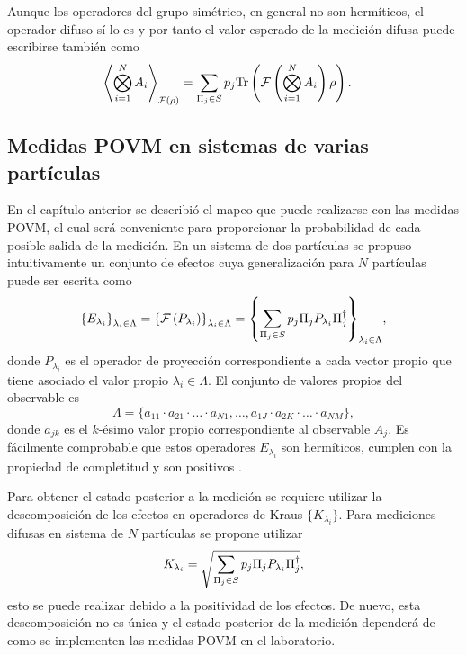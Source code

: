 Aunque los operadores del grupo simétrico, en general no son hermíticos, el operador difuso sí lo es y por tanto el valor esperado de la medición difusa puede escribirse también como \begin{equation}\label{eq:ExpectedValue-generalForm-2}\begin{split}
    \left \langle \bigotimes_{i=1}^{N} A_i\right \rangle_{\mathcal{F}(\rho)} &=\sum_{\Pi_j \in S}p_{j}{\rm Tr} \left(\mathcal{F}\left(\bigotimes_{i=1}^{N} A_i\right)\rho\right).
\end{split}
\end{equation} 



\subsection{Medidas POVM en sistemas de varias partículas}
En el capítulo anterior se describió el mapeo que puede realizarse con las medidas POVM, el cual será conveniente para proporcionar la probabilidad de cada posible salida de la medición. En un sistema de dos partículas se propuso intuitivamente un conjunto de efectos cuya generalización para $N$ partículas puede ser escrita como \begin{equation}\label{eq:effectsSetNp}
    {\{E_{\lambda_i}\}}_{\lambda_i \in \Lambda}={\{\mathcal{F}\left(P_{\lambda_i}\right)\}}_{\lambda_i \in \Lambda}={\left\{\sum_{\Pi_j \in S} p_j \Pi_{j}P_{\lambda_i}\Pi_{j}^{\dagger}\right\}}_{\lambda_i \in \Lambda},
\end{equation}  
donde $P_{\lambda_i}$ es el operador de proyección correspondiente a cada vector propio que tiene asociado el valor propio $\lambda_i\in \Lambda$. El conjunto de valores propios del observable es \begin{equation}\label{eq:lambdaeigenvalues}
    \Lambda=\{a_{11}\cdot a_{21}\cdot \hdots \cdot a_{N1},\hdots,a_{1J}\cdot a_{2K}\cdot \hdots \cdot a_{NM}\},
\end{equation} donde $a_{jk}$ es el $k$-ésimo valor propio correspondiente al observable $A_j$. Es fácilmente comprobable que estos operadores $E_{\lambda_i}$ son hermíticos, cumplen con la propiedad de completitud y son positivos .

Para obtener el estado posterior a la medición se requiere utilizar la descomposición de los efectos en operadores de Kraus $\{K_{\lambda_i}\}$. Para mediciones difusas en sistema de $N$ partículas se propone utilizar \begin{equation}
   K_{\lambda_i}=\sqrt{\sum_{\Pi_j \in S} p_j \Pi_{j}P_{\lambda_i}\Pi_{j}^{\dagger}},
\end{equation} esto se puede realizar debido a la positividad de los efectos. De nuevo, esta descomposición no es única y el estado posterior de la medición dependerá de como se implementen las medidas POVM en el laboratorio. 



